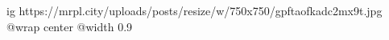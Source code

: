  
 
 
 
 

\ifcmt
  ig https://mrpl.city/uploads/posts/resize/w/750x750/gpftaofkadc2mx9t.jpg
  @wrap center
  @width 0.9
\fi
